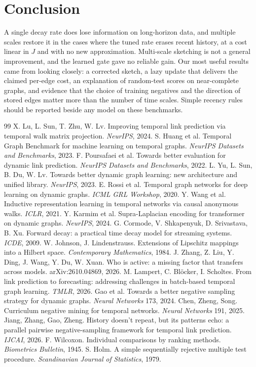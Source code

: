 \documentclass[11pt,a4paper]{article}
\theoremstyle{remark}
\begin{document}
\section{Conclusion}
A single decay rate does lose information on long-horizon data, and multiple scales restore it in the cases where the tuned rate erases recent history, at a cost linear in $J$ and with no new approximation. Multi-scale sketching is not a general improvement, and the learned gate gave no reliable gain. Our most useful results came from looking closely: a corrected sketch, a lazy update that delivers the claimed per-edge cost, an explanation of random-test scores on near-complete graphs, and evidence that the choice of training negatives and the direction of stored edges matter more than the number of time scales. Simple recency rules should be reported beside any model on these benchmarks.

\begin{thebibliography}{99}\small\itemsep1pt
 X. Lu, L. Sun, T. Zhu, W. Lv. Improving temporal link prediction via temporal walk matrix projection. \emph{NeurIPS}, 2024.
 S. Huang et al. Temporal Graph Benchmark for machine learning on temporal graphs. \emph{NeurIPS Datasets and Benchmarks}, 2023.
 F. Poursafaei et al. Towards better evaluation for dynamic link prediction. \emph{NeurIPS Datasets and Benchmarks}, 2022.
 L. Yu, L. Sun, B. Du, W. Lv. Towards better dynamic graph learning: new architecture and unified library. \emph{NeurIPS}, 2023.
 E. Rossi et al. Temporal graph networks for deep learning on dynamic graphs. \emph{ICML GRL Workshop}, 2020.
 Y. Wang et al. Inductive representation learning in temporal networks via causal anonymous walks. \emph{ICLR}, 2021.
 Y. Karmim et al. Supra-Laplacian encoding for transformer on dynamic graphs. \emph{NeurIPS}, 2024.
 G. Cormode, V. Shkapenyuk, D. Srivastava, B. Xu. Forward decay: a practical time decay model for streaming systems. \emph{ICDE}, 2009.
 W. Johnson, J. Lindenstrauss. Extensions of Lipschitz mappings into a Hilbert space. \emph{Contemporary Mathematics}, 1984.
 J. Zhang, Z. Liu, Y. Ding, J. Wang, Y. Du, W. Xuan. Who is active: a missing factor that transfers across models. arXiv:2610.04869, 2026.
 M. Lampert, C. Bl\"ocker, I. Scholtes. From link prediction to forecasting: addressing challenges in batch-based temporal graph learning. \emph{TMLR}, 2026.
 Gao et al. Towards a better negative sampling strategy for dynamic graphs. \emph{Neural Networks} 173, 2024.
 Chen, Zheng, Song. Curriculum negative mining for temporal networks. \emph{Neural Networks} 191, 2025.
 Jiang, Zhang, Gao, Zheng. History doesn't repeat, but its patterns echo: a parallel pairwise negative-sampling framework for temporal link prediction. \emph{IJCAI}, 2026.
 F. Wilcoxon. Individual comparisons by ranking methods. \emph{Biometrics Bulletin}, 1945.
 S. Holm. A simple sequentially rejective multiple test procedure. \emph{Scandinavian Journal of Statistics}, 1979.
\end{thebibliography}
\end{document}
